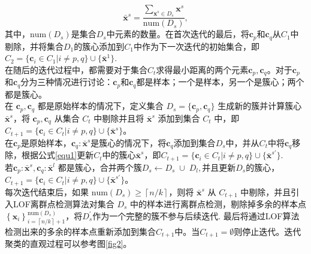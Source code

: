 \documentclass{NauThesis}
\begin{document}
\begin{equation} \label{equ1}
	\bar{\boldsymbol{x}}^s = \frac{\sum_{\boldsymbol{x}^s \in D_s} \boldsymbol{x}^s}{\text{num}(D_s)}, 
\end{equation}
其中，$\text{num}(D_s)$是集合$D_s$中元素的数量。在首次迭代的最后，将$\boldsymbol{c}_p$和$\boldsymbol{c}_q$从$C_1$中剔除，并将集合$D_1$的簇心添加到$C_1$中作为下一次迭代的初始集合，即$C_{2}=\{\boldsymbol{c}_i \in C_{1} | i \neq p, q\} \cup \{\bar{\boldsymbol{x}}^1\}$.
\\\hspace*{2em}在随后的迭代过程中，都需要对于集合$C_t$求得最小距离的两个元素$\boldsymbol{c}_p,\boldsymbol{c}_q$。对于$\boldsymbol{c}_p$和$\boldsymbol{c}_q$分为三种情况进行讨论：$\boldsymbol{c}_p$和$\boldsymbol{c}_q$都是样本；一个是样本，另一个是簇心；两个都是簇心。
\\\hspace*{2em}在 \( \boldsymbol{c}_p, \boldsymbol{c}_q \) 都是原始样本的情况下，定义集合 \( D_s = \{ \boldsymbol{c}_p, \boldsymbol{c}_q  \} \) 生成新的簇并计算簇心 \( \bar{\boldsymbol{x}}^s \)，将 \( \boldsymbol{c}_p, \boldsymbol{c}_q  \) 从集合 \( C_t \) 中剔除并且将 \( \bar{\boldsymbol{x}}^s \) 添加到集合 \( C_t \) 中，即 \( C_{t+1} = \{ \boldsymbol{c}_i \in C_t | i \neq p, q \} \cup \{ \bar{\boldsymbol{x}}^s \} \)。
\\\hspace*{2em}在\( \boldsymbol{c}_p\)是原始样本，\(\boldsymbol{c}_q:\bar{\boldsymbol{x}}^s\)是簇心的情况下，将\(\boldsymbol{c}_q\)添加到集合\(D_s\)中，并从\(C_t\)中将\(\boldsymbol{c}_q\)移除，根据公式\eqref{equ1}更新\(C_t\)中的簇心\(\bar{\boldsymbol{x}}^s\)，即$C_{t+1}=\{\boldsymbol{c}_i \in C_{t} | i \neq p, q\} \cup \{{\bar{\boldsymbol{x}}^{s\prime}}\}$.
\\\hspace*{2em}若\( \boldsymbol{c}_p:\bar{\boldsymbol{x}}^s, \boldsymbol{c}_q:\bar{\boldsymbol{x}}^l \) 都是簇心，合并两个簇$D_s\leftarrow{D_s}{\;\cup\;}{D_l},$并且更新$D_s$的簇心，$C_{t+1}=\{\boldsymbol{c}_i \in C_{t} | i \neq p, q\} \cup \{{\bar{\boldsymbol{x}}^{s\prime}}\}$。
\\\hspace*{2em}每次迭代结束后，如果 \( \text{num}\left(D_s\right) \geq \left\lceil n/{k} \right\rceil \)，则将 \( \bar{\boldsymbol{x}}^s \) 从 \( C_{t+1} \) 中剔除，并且引入LOF离群点检测\cite{ref52}算法对集合 \( D_s \) 中的样本进行离群点检测，剔除掉多余的样本点 \( \left\{ \boldsymbol{x}_i \right\}_{i=\left\lceil {n}/{k} \right\rceil+1}^{\text{num}\left(D_s\right)} \)，将$D_s^{\prime}$作为一个完整的簇不参与后续迭代.
最后将通过LOF算法检测出来的多余的样本点重新添加到集合$C_{t+1}$中。当$C_{t+1}=\emptyset$则停止迭代。迭代聚类的直观过程可以参考图\ref{fig2}。
\end{document}
